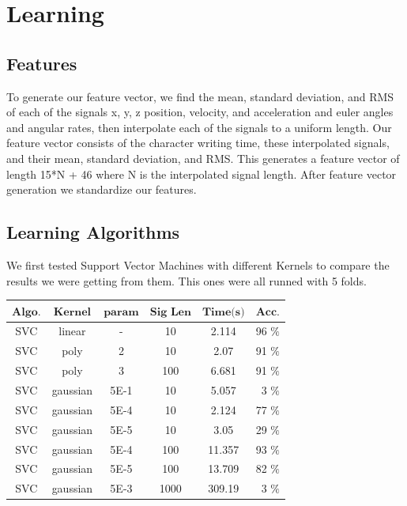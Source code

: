 \documentclass{article}
\begin{document}
\section{Learning}

\subsection{Features}
To generate our feature vector, we find the mean, standard deviation, and RMS of each of the signals x, y, z position, velocity, and acceleration and euler angles and angular rates, then interpolate each of the signals to a uniform length.  Our feature vector consists of the character writing time, these interpolated signals, and their mean, standard deviation, and RMS.  This generates a feature vector of length 15*N + 46 where N is the interpolated signal length.  After feature vector generation we standardize our features.  
 
\subsection{Learning Algorithms}
We first tested Support Vector Machines with different Kernels to compare the results we were getting from them. This ones were all runned with 5 folds.

\begin{center}
    \begin{tabular}{ | c | c | c | c | c | r |}
    \hline
    $\textbf{Algo.}$ & $\textbf{Kernel}$  & $\textbf{param}$ & $\textbf{Sig Len}$ & $\textbf{Time(s)}$ & $\textbf{Acc.}$ \\ \hline
    SVC & linear & - & 10 & 2.114 & 96 $\%$ \\ \hline
    SVC & poly & 2 & 10 & 2.07 & 91 $\%$ \\ \hline
    SVC & poly & 3 & 100 & 6.681 & 91 $\%$ \\ \hline
    SVC & gaussian & 5E-1 & 10 & 5.057 & 3 $\%$ \\ \hline
    SVC & gaussian & 5E-4 & 10 & 2.124 & 77 $\%$ \\ \hline
    SVC & gaussian & 5E-5 & 10 & 3.05 & 29 $\%$ \\ \hline
    SVC & gaussian & 5E-4 & 100 & 11.357 & 93 $\%$ \\ \hline
    SVC & gaussian & 5E-5 & 100 & 13.709 & 82 $\%$ \\ \hline
    SVC & gaussian & 5E-3 & 1000 & 309.19 & 3 $\%$ \\ \hline
    
    \end{tabular}
\end{center}
\end{document}
